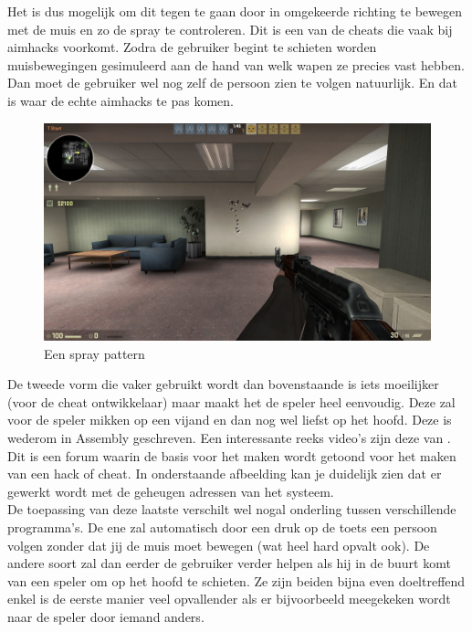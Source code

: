 \documentclass[pdftex,a4paper,12pt,twoside]{report}
\begin{document}
Het is dus mogelijk om dit tegen te gaan door in omgekeerde richting te bewegen met de muis en zo de spray te controleren. Dit is een van de \gls{cheat}s die vaak bij \gls{aim}hacks voorkomt. Zodra de gebruiker begint te schieten worden muisbewegingen gesimuleerd aan de hand van welk wapen ze precies vast hebben. Dan moet de gebruiker wel nog zelf de persoon zien te volgen natuurlijk. En dat is waar de echte \gls{aim}hacks te pas komen.

\begin{figure}[H]
\centering
\includegraphics[width=15cm]{img/spraypattern-example}
\caption{Een spray pattern}
\end{figure}

De tweede vorm die vaker gebruikt wordt dan bovenstaande is iets moeilijker (voor de cheat ontwikkelaar) maar maakt het de speler heel eenvoudig. Deze zal voor de speler mikken op een vijand en dan nog wel liefst op het hoofd. Deze is wederom in Assembly geschreven. Een interessante reeks video's zijn deze van \cite{basicaimbottutorial}. Dit is een forum waarin de basis voor het maken wordt getoond voor het maken van een hack of \gls{cheat}. In onderstaande afbeelding kan je duidelijk zien dat er gewerkt wordt met de geheugen adressen van het systeem. 
\\

De toepassing van deze laatste verschilt wel nogal onderling tussen verschillende programma's. De ene zal automatisch door een druk op de toets een persoon volgen zonder dat jij de muis moet bewegen (wat heel hard opvalt ook). De andere soort zal dan eerder de gebruiker verder helpen als hij in de buurt komt van een speler om op het hoofd te schieten. Ze zijn beiden bijna even doeltreffend enkel is de eerste manier veel opvallender als er bijvoorbeeld meegekeken wordt naar de speler door iemand anders.
\newpage
\end{document}
